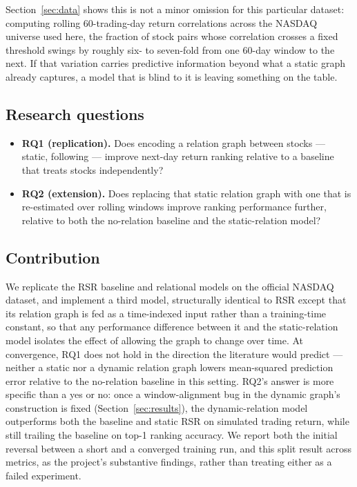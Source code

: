 \documentclass[12pt]{article}
\begin{document}
Section~\ref{sec:data} shows this is not a minor omission for this particular dataset: computing
rolling 60-trading-day return correlations across the NASDAQ universe used here, the fraction of
stock pairs whose correlation crosses a fixed threshold swings by roughly six- to seven-fold from
one 60-day window to the next. If that variation carries predictive information beyond what a
static graph already captures, a model that is blind to it is leaving something on the table.

\subsection{Research questions}

\begin{itemize}
  \item \textbf{RQ1 (replication).} Does encoding a relation graph between stocks --- static,
  following \citet{feng2019temporal} --- improve next-day return ranking relative to a baseline
  that treats stocks independently?
  \item \textbf{RQ2 (extension).} Does replacing that static relation graph with one that is
  re-estimated over rolling windows improve ranking performance further, relative to both the
  no-relation baseline and the static-relation model?
\end{itemize}

\subsection{Contribution}

We replicate the RSR baseline and relational models on the official NASDAQ dataset, and implement
a third model, structurally identical to RSR except that its relation graph is fed as a
time-indexed input rather than a training-time constant, so that any performance difference
between it and the static-relation model isolates the effect of allowing the graph to change over
time. At convergence, RQ1 does not hold in the direction the literature would predict --- neither
a static nor a dynamic relation graph lowers mean-squared prediction error relative to the
no-relation baseline in this setting. RQ2's answer is more specific than a yes or no: once a
window-alignment bug in the dynamic graph's construction is fixed (Section~\ref{sec:results}), the
dynamic-relation model outperforms both the baseline and static RSR on simulated trading return,
while still trailing the baseline on top-1 ranking accuracy. We report both the initial reversal
between a short and a converged training run, and this split result across metrics, as the
project's substantive findings, rather than treating either as a failed experiment.
\end{document}
